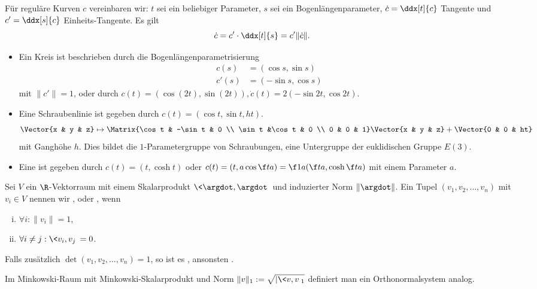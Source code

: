 \begin{conv}
	Für reguläre Kurven $c$ vereinbaren wir:
	$t$ sei ein beliebiger Parameter, $s$ sei ein Bogenlängenparameter, $\dot c = \ddx[t]{c}$ Tangente und $c' = \ddx[s]{c}$ Einheits-Tangente.
	Es gilt
	\[
		\dot c = c' \cdot \ddx[t]{s} = c' \|\dot c\|.
	\]
\end{conv}

\begin{ex}
	\begin{itemize}
		\item
			Ein Kreis ist beschrieben durch die Bogenlängenparametrisierung
			\begin{align*}
				c(s) &= (\cos s, \sin s) \\
				c'(s) &= (-\sin s, \cos s)
			\end{align*}
			mit $\|c'\| = 1$, oder durch $c(t) = (\cos (2t), \sin(2t)), \dot c(t) = 2(-\sin 2t, \cos 2t)$.
		\item
			Eine Schraubenlinie ist gegeben durch $c(t) = (\cos t, \sin t, ht)$.
			\[
				\Vector{x & y & z}
				\mapsto
				\Matrix{\cos t & -\sin t & 0 \\ \sin t &\cos t & 0 \\ 0 & 0 & 1}
				\Vector{x & y & z}
				+ \Vector{0 & 0 & ht}
			\]
			mit Ganghöhe $h$.
			Dies bildet die $1$-Parametergruppe von Schraubungen, eine Untergruppe der euklidischen Gruppe $E(3)$.
		\item
			Eine  ist gegeben durch $c(t) = (t, \cosh t)$ oder $c(t) = (t, a \cos \f ta) = \f 1a (\f ta, \cosh \f ta)$ mit einem Parameter $a$.
	\end{itemize}
\end{ex}

\begin{df}
	Sei $V$ ein $\R$-Vektorraum mit einem Skalarprodukt $\<\argdot, \argdot\>$ und induzierter Norm $\|\argdot\|$.
	Ein Tupel $(v_1, v_2, \dotsc, v_n)$ mit $v_i \in V$ nennen wir , oder , wenn
	\begin{enumerate}[i)]
		\item
			$\forall i : \|v_i\| = 1$,
		\item
			$\forall i \neq j : \<v_i, v_j\> = 0$.
	\end{enumerate}
	Falls zusätzlich $\det(v_1, v_2, \dotsc, v_n) = 1$, so ist es , ansonsten .
	\begin{note}
		Im Minkowski-Raum mit Minkowski-Skalarprodukt und Norm $\|v\|_1 := \sqrt{|\<v,v\>_1}$ definiert man ein Orthonormalsystem analog.
	\end{note}
\end{df}

